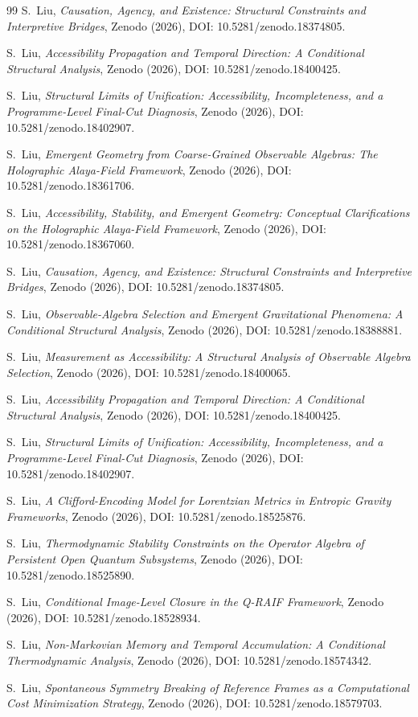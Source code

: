 \documentclass[12pt,a4paper,openany]{book}
\begin{document}
\begin{thebibliography}{99}
S.~Liu, \emph{Causation, Agency, and Existence: Structural Constraints and Interpretive Bridges}, Zenodo (2026), DOI: 10.5281/zenodo.18374805.

S.~Liu, \emph{Accessibility Propagation and Temporal Direction: A Conditional Structural Analysis}, Zenodo (2026), DOI: 10.5281/zenodo.18400425.

S.~Liu, \emph{Structural Limits of Unification: Accessibility, Incompleteness, and a Programme-Level Final-Cut Diagnosis}, Zenodo (2026), DOI: 10.5281/zenodo.18402907.

S.~Liu, \emph{Emergent Geometry from Coarse-Grained Observable Algebras: The Holographic Alaya-Field Framework}, Zenodo (2026), DOI: 10.5281/zenodo.18361706.

S.~Liu, \emph{Accessibility, Stability, and Emergent Geometry: Conceptual Clarifications on the Holographic Alaya-Field Framework}, Zenodo (2026), DOI: 10.5281/zenodo.18367060.

S.~Liu, \emph{Causation, Agency, and Existence: Structural Constraints and Interpretive Bridges}, Zenodo (2026), DOI: 10.5281/zenodo.18374805.

S.~Liu, \emph{Observable-Algebra Selection and Emergent Gravitational Phenomena: A Conditional Structural Analysis}, Zenodo (2026), DOI: 10.5281/zenodo.18388881.

S.~Liu, \emph{Measurement as Accessibility: A Structural Analysis of Observable Algebra Selection}, Zenodo (2026), DOI: 10.5281/zenodo.18400065.

S.~Liu, \emph{Accessibility Propagation and Temporal Direction: A Conditional Structural Analysis}, Zenodo (2026), DOI: 10.5281/zenodo.18400425.

S.~Liu, \emph{Structural Limits of Unification: Accessibility, Incompleteness, and a Programme-Level Final-Cut Diagnosis}, Zenodo (2026), DOI: 10.5281/zenodo.18402907.

S.~Liu, \emph{A Clifford-Encoding Model for Lorentzian Metrics in Entropic Gravity Frameworks}, Zenodo (2026), DOI: 10.5281/zenodo.18525876.

S.~Liu, \emph{Thermodynamic Stability Constraints on the Operator Algebra of Persistent Open Quantum Subsystems}, Zenodo (2026), DOI: 10.5281/zenodo.18525890.

S.~Liu, \emph{Conditional Image-Level Closure in the Q-RAIF Framework}, Zenodo (2026), DOI: 10.5281/zenodo.18528934.

S.~Liu, \emph{Non-Markovian Memory and Temporal Accumulation: A Conditional Thermodynamic Analysis}, Zenodo (2026), DOI: 10.5281/zenodo.18574342.

S.~Liu, \emph{Spontaneous Symmetry Breaking of Reference Frames as a Computational Cost Minimization Strategy}, Zenodo (2026), DOI: 10.5281/zenodo.18579703.

\end{thebibliography}
\end{document}
